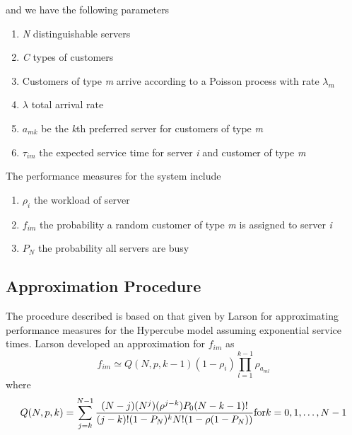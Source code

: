 \begin{frame}
  and we have the following parameters
  \begin{enumerate}
  \item \textit{N} distinguishable servers
  \item \textit{C} types of customers
  \item Customers of type \textit{m} 
    arrive according to a Poisson process with rate $\lambda_{m}$
  \item $\lambda$ total arrival rate
  \item $a_{mk}$ be the \textit{k}th preferred server
    for customers of type \textit{m}
  \item $\tau_{im}$ the expected service time
    for server \textit{i} and customer of type \textit{m}
  \end{enumerate}
\end{frame}

\begin{frame}
  The performance measures for the system include 
  \begin{enumerate}
  \item $\rho_i$ the workload of server 
  \item $f_{im}$ the probability a random customer of type \textit{m}
    is assigned to server \textit{i}
  \item $P_{N}$ the probability all servers are busy
  \end{enumerate}
\end{frame}

\subsection{Approximation Procedure}
\begin{frame}
  The procedure described
  is based on that given by Larson \cite{larson1975approximating}
  for approximating performance measures for the Hypercube model
  assuming exponential service times.
  Larson developed an approximation for $f_{im}$ as
  \begin{equation} \label{f_im}
    f_{im} \simeq Q(N,p,k-1)(1-\rho_{i})\prod_{l=1}^{k-1}{\rho_{a_{ml}}}
  \end{equation}
  where
  \begin{equation} \label{Q}
    Q(N,p,k)=\sum_{j=k}^{N-1}{
      \frac{(N-j)(N^j)(\rho^{j-k})P_0(N-k-1)!}
           {(j-k)!(1-P_N)^kN!(1-\rho(1-P_N))}
    } \\
    \hfill \mbox{for} k = 0,1,\ldots,N-1
  \end{equation}
\end{frame}

